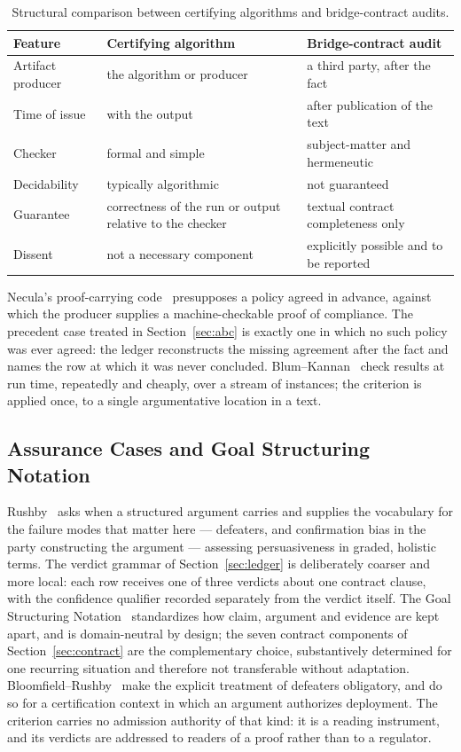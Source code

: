 \documentclass[11pt,a4paper]{article}
\begin{document}
\begin{table}[htbp]
\centering
\small
\caption{Structural comparison between certifying algorithms and bridge-contract audits.}
\label{tab:certifying_vs_bcm}
\begin{tabularx}{\textwidth}{@{}l X X@{}}
\toprule
Feature & Certifying algorithm & Bridge-contract audit \\
\midrule
Artifact producer & the algorithm or producer & a third party, after the fact \\
Time of issue & with the output & after publication of the text \\
Checker & formal and simple & subject-matter and hermeneutic \\
Decidability & typically algorithmic & not guaranteed \\
Guarantee & correctness of the run or output relative to the checker
  & textual contract completeness only \\
Dissent & not a necessary component & explicitly possible and to be reported \\
\bottomrule
\end{tabularx}
\end{table}

\noindent
Necula's proof-carrying code~\cite{Necula1997} presupposes a policy agreed in
advance, against which the producer supplies a machine-checkable proof of
compliance. The precedent case treated in Section~\ref{sec:abc} is exactly one
in which no such policy was ever agreed: the
ledger reconstructs the missing agreement after the fact and names the row at
which it was never concluded. Blum--Kannan~\cite{Blum1995} check results at run
time, repeatedly and cheaply, over a stream of instances; the criterion is
applied once, to a single argumentative location in a text.

\subsection{Assurance Cases and Goal Structuring Notation}\label{sec:related-assurance}

Rushby~\cite{Rushby2015} asks when a structured argument carries and supplies
the vocabulary for the failure modes that matter here --- defeaters, and
confirmation bias in the party constructing the argument --- assessing
persuasiveness in graded, holistic terms. The verdict grammar of
Section~\ref{sec:ledger} is deliberately coarser and more local: each row
receives one of three verdicts about one contract clause, with the confidence
qualifier recorded separately from the verdict itself. The Goal Structuring
Notation~\cite{GSN2021} standardizes how claim, argument and evidence are kept
apart, and is domain-neutral by design; the seven contract components of
Section~\ref{sec:contract} are the complementary choice, substantively
determined for one recurring situation and therefore not transferable without
adaptation. Bloomfield--Rushby~\cite{Bloomfield2021} make
the explicit treatment of defeaters obligatory, and do so for a certification
context in which an argument authorizes deployment. The criterion carries no
admission authority of that kind: it is a reading instrument, and its verdicts
are addressed to readers of a proof rather than to a regulator.
\end{document}
